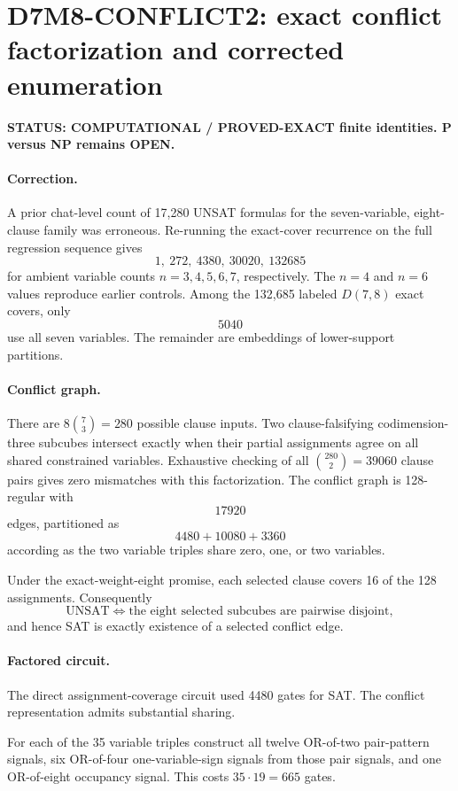 \section*{D7M8-CONFLICT2: exact conflict factorization and corrected enumeration}

\textbf{STATUS: COMPUTATIONAL / PROVED-EXACT finite identities. P versus NP remains OPEN.}

\paragraph{Correction.}
A prior chat-level count of 17,280 UNSAT formulas for the seven-variable,
eight-clause family was erroneous. Re-running the exact-cover recurrence on the full
regression sequence gives
\[
1,\ 272,\ 4380,\ 30020,\ \boxed{132685}
\]
for ambient variable counts $n=3,4,5,6,7$, respectively. The $n=4$ and $n=6$
values reproduce earlier controls. Among the 132,685 labeled $D(7,8)$ exact covers,
only
\[
\boxed{5040}
\]
use all seven variables. The remainder are embeddings of lower-support partitions.

\paragraph{Conflict graph.}
There are $8\binom73=280$ possible clause inputs. Two clause-falsifying
codimension-three subcubes intersect exactly when their partial assignments agree on
all shared constrained variables. Exhaustive checking of all $\binom{280}{2}=39060$
clause pairs gives zero mismatches with this factorization. The conflict graph is
128-regular with
\[
\boxed{17920}
\]
edges, partitioned as
\[
4480+10080+3360
\]
according as the two variable triples share zero, one, or two variables.

Under the exact-weight-eight promise, each selected clause covers 16 of the 128
assignments. Consequently
\[
\mathrm{UNSAT}
\iff
\text{the eight selected subcubes are pairwise disjoint},
\]
and hence SAT is exactly existence of a selected conflict edge.

\paragraph{Factored circuit.}
The direct assignment-coverage circuit used 4480 gates for SAT. The conflict
representation admits substantial sharing.

For each of the 35 variable triples construct all twelve OR-of-two pair-pattern
signals, six OR-of-four one-variable-sign signals from those pair signals, and one
OR-of-eight occupancy signal. This costs $35\cdot19=665$ gates.

